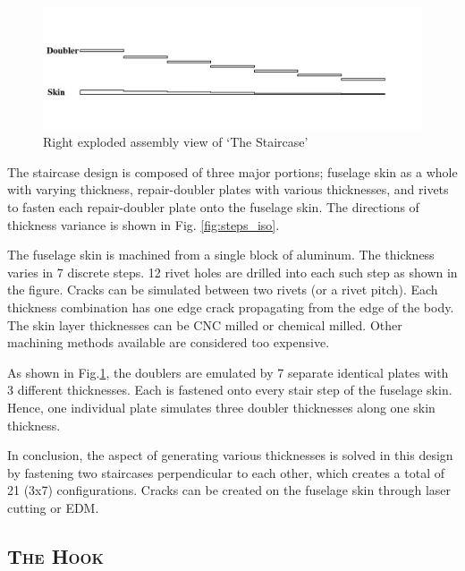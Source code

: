 \documentclass[12pt]{article}
\begin{document}
\begin{figure}[h!]
  \centering
  	\includegraphics[width=\textwidth]{Steps_right}
  \caption{Right exploded assembly view of `The Staircase'}
  \label{fig:steps_right}
\end{figure}

The staircase design is composed of three major portions;  fuselage skin as a whole with varying thickness,  repair-doubler plates with various thicknesses, and rivets to fasten each repair-doubler plate onto the fuselage skin. The directions of thickness variance is shown in Fig. \ref{fig:steps_iso}.

The fuselage skin is machined from a single block of aluminum. The thickness varies in 7 discrete steps. 12 rivet holes are drilled into each such step as shown in the figure. Cracks can be simulated between two rivets (or a rivet pitch). Each thickness combination has one edge crack propagating from the edge of the body. The skin layer thicknesses can be CNC milled or chemical milled. Other machining methods available are considered too expensive.

As shown in Fig.\ref{fig:steps_right}, the doublers are emulated by 7 separate identical plates with 3 different thicknesses. Each is fastened onto every stair step of the fuselage skin. Hence, one individual plate simulates three doubler thicknesses along one skin thickness.

In conclusion, the aspect of generating various thicknesses is solved in this design by fastening two staircases perpendicular to each other, which creates a total of 21 (3x7) configurations. Cracks can be created on the fuselage skin through laser cutting or EDM.
\clearpage
\subsection{\textsc{The Hook} }
\end{document}
